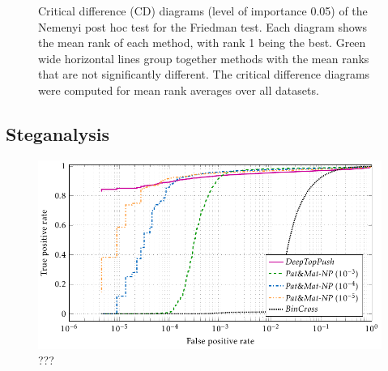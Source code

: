 \begin{figure}[!p]
  \centering
  
  \caption{Critical difference (CD) diagrams (level of importance 0.05) of the Nemenyi post hoc test for the Friedman test. Each diagram shows the mean rank of each method, with rank 1 being the best. Green wide horizontal lines group together methods with the mean ranks that are not significantly different. The critical difference diagrams were computed for mean rank averages over all datasets.}
  \label{fig: critical diagrams primal NN}
\end{figure}

\subsection{Steganalysis}


\begin{figure}
  \centering
  \includegraphics{images/stego_nsft5.pdf}
  \caption{???}
  \label{fig: steganalysis nsft5}
\end{figure}

